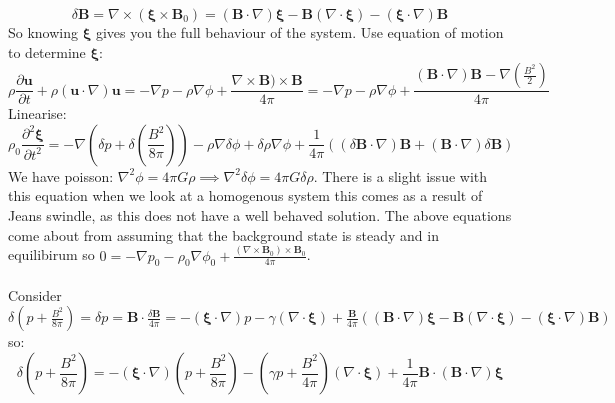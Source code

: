 \documentclass{article}
\begin{document}
\begin{equation}
\delta \bm B= \nabla \times(\bm \xi\times \bm B_0) = (\bm B \cdot \nabla) \bm \xi - \bm B(\nabla \cdot \bm \xi) - (\bm \xi \cdot \nabla) \bm B
\end{equation}
So knowing $\bm \xi$ gives you the full behaviour of the system. Use equation of motion to determine $\bm \xi$:
$$
\rho \frac{\partial \bm u}{\partial t} + \rho (\bm u \cdot \nabla ) \bm u = - \nabla p - \rho \nabla \phi + \frac{\nabla \times \bm B) \times \bm B}{4 \pi} = - \nabla p - \rho \nabla \phi + \frac{(\bm B \cdot \nabla) \bm B - \nabla (\frac{ B^2}{2})}{4\pi}
$$
Linearise:
$$
\rho_0 \frac{\partial^2 \bm \xi}{\partial t^2} =  - \nabla (\delta p + \delta(\frac{ B^2}{8\pi}) ) - \rho \nabla \delta \phi + \delta \rho \nabla \phi + \frac{1}{4\pi} ((\delta \bm B \cdot \nabla) \bm B + (\bm B \cdot \nabla) \delta \bm B)
$$
We have poisson: $\nabla ^2 \phi = 4 \pi G \rho \implies \nabla^2 \delta \phi = 4\pi G \delta \rho$. There is a slight issue with this equation when we look at a homogenous system this comes as a result of Jeans swindle, as this does not have a well behaved solution. The above equations come about from assuming that the background state is steady and in equilibirum so $0 = - \nabla p_0 - \rho_0 \nabla \phi_0 + \frac{(\nabla \times \bm B_0)\times \bm B_0}{4 \pi}$.\\\\
Consider $\delta (p + \frac{B^2}{8\pi}) = \delta p = \bm B \cdot \frac{\delta \bm B}{4 \pi} = - (\bm \xi \cdot \nabla) p - \gamma (\nabla \cdot \bm \xi) + \frac{\bm B}{4\pi} ((\bm B \cdot \nabla) \bm \xi - \bm B(\nabla \cdot \bm \xi)- (\bm \xi \cdot \nabla)\bm B) $ so:
$$
\delta (p + \frac{B^2}{8\pi}) = - (\bm \xi \cdot \nabla)(p + \frac{B^2}{8\pi}) - (\gamma p + \frac{B^2}{4\pi} )(\nabla \cdot \bm \xi) + \frac{1}{4\pi} \bm B \cdot (\bm B \cdot \nabla) \bm \xi
$$
\end{document}
